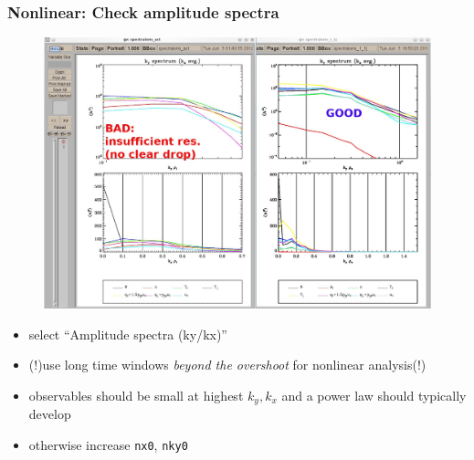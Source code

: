 \documentclass[9pt]{beamer}
\begin{document}
\begin{frame}
  \frametitle{Nonlinear: Check amplitude spectra}

\begin{figure}
\includegraphics[height=0.6\textheight]{figs/spectra.jpg}
\end{figure}

\begin{block}{}
\begin{itemize}
 \item select ``Amplitude spectra (ky/kx)''
 \item (!)use long time windows {\em beyond the overshoot} for nonlinear analysis(!)
 \item observables should be small at highest $k_y, k_x$ and a power law should typically
develop
\item otherwise increase {\tt nx0}, {\tt nky0}
\end{itemize}

\end{block}


\end{frame}

\end{document}
